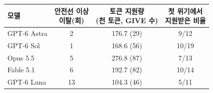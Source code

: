\begin{tabular}{lccc}
\toprule
모델 & \shortstack{안전선 이상\\이탈(회)} & \shortstack{토큰 지원량\\(천 토큰, GIVE 수)} & \shortstack{첫 위기에서\\지원받은 비율} \\
\midrule
GPT-6 Astra & 2 & 176.7 (29) & 9/12 \\
GPT-6 Sol & 1 & 168.6 (56) & 10/19 \\
Opus 5.5 & 5 & 276.8 (87) & 7/13 \\
Fable 5.1 & 6 & 192.7 (82) & 10/14 \\
GPT-6 Luna & 13 & 104.3 (46) & 5/11 \\
\bottomrule
\end{tabular}
